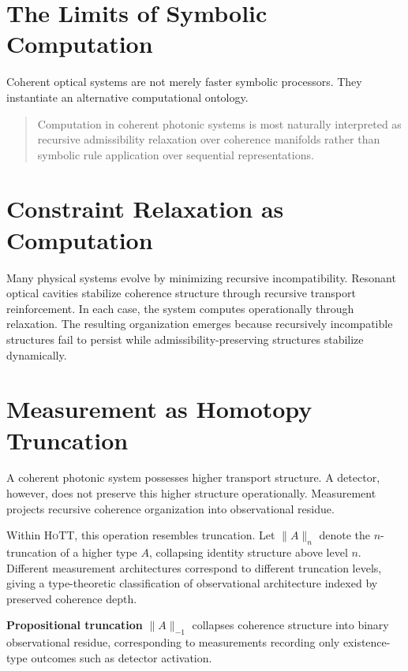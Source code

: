 \documentclass[11pt,openany]{book}
\theoremstyle{definition}
\theoremstyle{plain}
\newcommand{\HoTT}{\textsc{HoTT}}
\begin{document}
\bigskip

\section{The Limits of Symbolic Computation}

Coherent optical systems are not merely faster symbolic processors. They instantiate an alternative computational ontology.

\begin{quote}
Computation in coherent photonic systems is most naturally interpreted as recursive admissibility relaxation over coherence manifolds rather than symbolic rule application over sequential representations.
\end{quote}

\section{Constraint Relaxation as Computation}

Many physical systems evolve by minimizing recursive incompatibility. Resonant optical cavities stabilize coherence structure through recursive transport reinforcement. In each case, the system computes operationally through relaxation. The resulting organization emerges because recursively incompatible structures fail to persist while admissibility-preserving structures stabilize dynamically.

\section{Measurement as Homotopy Truncation}

A coherent photonic system possesses higher transport structure. A detector, however, does not preserve this higher structure operationally. Measurement projects recursive coherence organization into observational residue.

Within \HoTT, this operation resembles truncation. Let $\|A\|_n$ denote the $n$-truncation of a higher type $A$, collapsing identity structure above level $n$. Different measurement architectures correspond to different truncation levels, giving a type-theoretic classification of observational architecture indexed by preserved coherence depth.

\textbf{Propositional truncation} $\|A\|_{-1}$ collapses coherence structure into binary observational residue, corresponding to measurements recording only existence-type outcomes such as detector activation.
\end{document}
